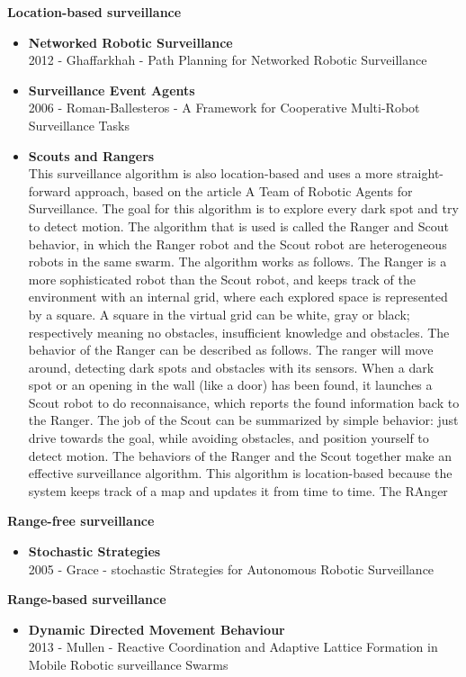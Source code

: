 \textbf{Location-based surveillance}
\begin{itemize}
\item \textbf{Networked Robotic Surveillance}\\

  2012 - Ghaffarkhah - Path Planning for Networked Robotic Surveillance
\item \textbf{Surveillance Event Agents}\\
  2006 - Roman-Ballesteros - A Framework for Cooperative Multi-Robot Surveillance Tasks
\item \textbf{Scouts and Rangers}\\
This surveillance algorithm is also location-based and uses a more straight-forward approach, based on the article A Team of Robotic Agents for Surveillance.  \cite{Rybsky200}
The goal for this algorithm is to explore every dark spot and try to detect motion. 
The algorithm that is used is called the Ranger and Scout behavior, in which the Ranger robot and the Scout robot are heterogeneous robots in the same swarm. 
The algorithm works as follows. The Ranger is a more sophisticated robot than the Scout robot, and keeps track of the environment with an internal grid, where each explored space is represented by a square. 
A square in the virtual grid can be white, gray or black; respectively meaning no obstacles, insufficient knowledge and obstacles. 
The behavior of the Ranger can be described as follows. The ranger will move around, detecting dark spots and obstacles with its sensors.
When a dark spot or an opening in the wall (like a door) has been found, it launches a Scout robot to do reconnaisance, which reports the found information back to the Ranger. 
The job of the Scout can be summarized by simple behavior: just drive towards the goal, while avoiding obstacles, and position yourself to detect motion. 
The behaviors of the Ranger and the Scout together make an effective surveillance algorithm. 
This algorithm is location-based because the system keeps track of a map and updates it from time to time. 
The RAnger
\end{itemize}

\textbf{Range-free surveillance}
\begin{itemize}
\item \textbf{Stochastic Strategies}\\
  2005 - Grace - stochastic Strategies for Autonomous Robotic Surveillance
\end{itemize}

\textbf{Range-based surveillance}
\begin{itemize}
\item \textbf{Dynamic Directed Movement Behaviour}\\
  2013 - Mullen - Reactive Coordination and Adaptive Lattice Formation in Mobile Robotic surveillance Swarms
\end{itemize}

